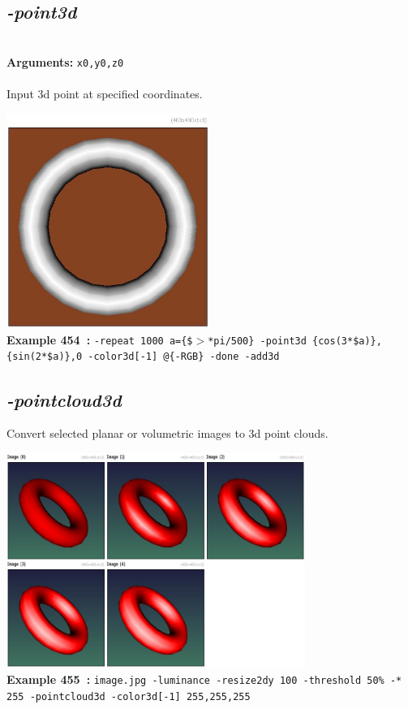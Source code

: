 \documentclass[a4paper,11pt,twoside]{book}
\begin{document}
\subsection{\emph{-point3d} }\vspace*{-0.5em}
~\\\textbf{Arguments: } 
{\small \texttt{x0,y0,z0}}\\~\\
Input 3d point at specified coordinates.
\begin{center}\includegraphics[keepaspectratio=true,height=7cm,width=\textwidth]{img/gmic_def454.jpg}\\
{\footnotesize \textbf{Example 454~:} \texttt{-repeat 1000 a=\{\$$>$*pi/500\} -point3d \{cos(3*\$a)\},\{sin(2*\$a)\},0 -color3d[-1] @\{-RGB\} -done -add3d}}
\end{center}

\subsection{\emph{-pointcloud3d} }\vspace*{-0.5em}
Convert selected planar or volumetric images to 3d point clouds.
\begin{center}\includegraphics[keepaspectratio=true,height=7cm,width=\textwidth]{img/gmic_def455.jpg}\\
{\footnotesize \textbf{Example 455~:} \texttt{image.jpg -luminance -resize2dy 100 -threshold 50\% -* 255 -pointcloud3d -color3d[-1] 255,255,255}}
\end{center}
\end{document}
